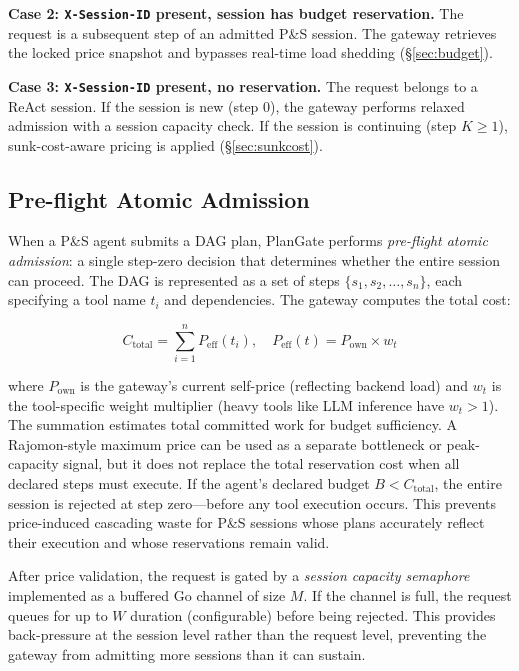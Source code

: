 \documentclass[sigconf,review,anonymous]{acmart}
\begin{document}
\noindent\textbf{Case 2: \texttt{X-Session-ID} present, session has budget reservation.} The request is a subsequent step of an admitted P\&S session. The gateway retrieves the locked price snapshot and bypasses real-time load shedding (\S\ref{sec:budget}).

\noindent\textbf{Case 3: \texttt{X-Session-ID} present, no reservation.} The request belongs to a ReAct session. If the session is new (step 0), the gateway performs relaxed admission with a session capacity check. If the session is continuing (step $K \geq 1$), sunk-cost-aware pricing is applied (\S\ref{sec:sunkcost}).


\subsection{Pre-flight Atomic Admission}
\label{sec:preflight}

When a P\&S agent submits a DAG plan, PlanGate performs \emph{pre-flight atomic admission}: a single step-zero decision that determines whether the entire session can proceed. The DAG is represented as a set of steps $\{s_1, s_2, \ldots, s_n\}$, each specifying a tool name $t_i$ and dependencies. The gateway computes the total cost:

\begin{equation}
C_{\text{total}} = \sum_{i=1}^{n} P_{\text{eff}}(t_i), \quad P_{\text{eff}}(t) = P_{\text{own}} \times w_t
\end{equation}

\noindent where $P_{\text{own}}$ is the gateway's current self-price (reflecting backend load) and $w_t$ is the tool-specific weight multiplier (heavy tools like LLM inference have $w_t > 1$). The summation estimates total committed work for budget sufficiency. A Rajomon-style maximum price can be used as a separate bottleneck or peak-capacity signal, but it does not replace the total reservation cost when all declared steps must execute. If the agent's declared budget $B < C_{\text{total}}$, the entire session is rejected at step zero---before any tool execution occurs. This prevents price-induced cascading waste for P\&S sessions whose plans accurately reflect their execution and whose reservations remain valid.


After price validation, the request is gated by a \emph{session capacity semaphore} implemented as a buffered Go channel of size $M$. If the channel is full, the request queues for up to $W$ duration (configurable) before being rejected. This provides back-pressure at the session level rather than the request level, preventing the gateway from admitting more sessions than it can sustain.
\end{document}
